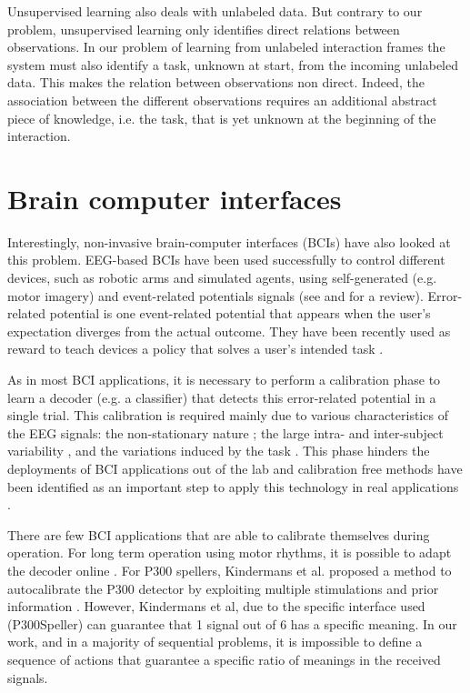 \transition

Unsupervised learning also deals with unlabeled data. But contrary to our problem, unsupervised learning only identifies direct relations between observations. In our problem of learning from unlabeled interaction frames the system must also identify a task, unknown at start, from the incoming unlabeled data. This makes the relation between observations non direct. Indeed, the association between the different observations requires an additional abstract piece of knowledge, i.e. the task, that is yet unknown at the beginning of the interaction.

\section{Brain computer interfaces}

Interestingly, non-invasive brain-computer interfaces (BCIs) have also looked at this problem. EEG-based BCIs have been used successfully to control different devices, such as robotic arms and simulated agents, using self-generated (e.g. motor imagery) and event-related potentials signals (see \cite{chavarriaga2014errare} and \cite{millan10} for a review). 
%
Error-related potential is one event-related potential that appears when the user's expectation diverges from the actual outcome. They have been recently used as reward to teach devices a policy that solves a user's intended task \cite{chavarriaga2010learning,iturrate2010robot}.

As in most BCI applications, it is necessary to perform a calibration phase to learn a decoder (e.g. a classifier) that detects this error-related potential in a single trial. This calibration is required mainly due to various characteristics of the EEG signals: the non-stationary nature \cite{vidaurre11}; the large intra- and inter-subject variability \cite{Polich1997}, and the variations induced by the task \cite{iturrate2013task}. This phase hinders the deployments of BCI applications out of the lab and calibration free methods have been identified as an important step to apply this technology in real applications \cite{millan10}. 

There are few BCI applications that are able to calibrate themselves during operation.  For long term operation using motor rhythms, it is possible to adapt the decoder online \cite{vidaurre2010towards}. For P300 spellers, Kindermans et al. proposed a method to autocalibrate the P300 detector by exploiting multiple stimulations and prior information \cite{Kindermans2012a,Kindermans2012b}. However, Kindermans et al, due to the specific interface used (P300Speller) can guarantee that 1 signal out of 6 has a specific meaning. In our work, and in a majority of sequential problems, it is impossible to define a sequence of actions that guarantee a specific ratio of meanings in the received signals.

